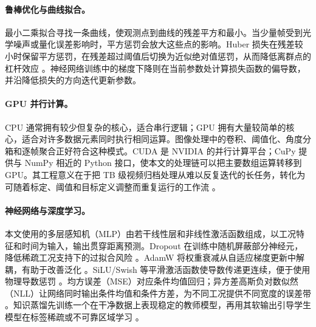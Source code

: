 \paragraph{鲁棒优化与曲线拟合。}
最小二乘拟合寻找一条曲线，使观测点到曲线的残差平方和最小。当少量帧受到光学噪声或量化误差影响时，平方惩罚会放大这些点的影响。Huber 损失在残差较小时保留平方惩罚，在残差超过阈值后切换为近似绝对值惩罚，从而降低离群点的杠杆效应 \cite{Huber1964,NocedalWright2006}。神经网络训练中的梯度下降则在当前参数处计算损失函数的偏导数，并沿降低损失的方向迭代更新参数。

\paragraph{GPU 并行计算。}
CPU 通常拥有较少但复杂的核心，适合串行逻辑；GPU 拥有大量较简单的核心，适合对许多数据元素同时执行相同运算。图像处理中的卷积、阈值化、角度分箱和逐帧聚合正好符合这种模式。CUDA 是 NVIDIA 的并行计算平台；CuPy 提供与 NumPy 相近的 Python 接口，使本文的处理链可以把主要数组运算转移到 GPU。其工程意义在于把 TB 级视频归档处理从难以反复迭代的长任务，转化为可随着标定、阈值和目标定义调整而重复运行的工作流 \cite{NickollsBuckGarlandSkadron2008}。

\paragraph{神经网络与深度学习。}
本文使用的多层感知机（MLP）由若干线性层和非线性激活函数组成，以工况特征和时间为输入，输出贯穿距离预测。Dropout 在训练中随机屏蔽部分神经元，降低稀疏工况支持下的过拟合风险 \cite{Srivastava2014Dropout}。AdamW 将权重衰减从自适应梯度更新中解耦，有助于改善泛化 \cite{LoshchilovHutter2019AdamW}。SiLU/Swish 等平滑激活函数使导数传递更连续，便于使用物理导数惩罚 \cite{Ramachandran2017Swish}。均方误差（MSE）对应条件均值回归；异方差高斯负对数似然（NLL）让网络同时输出条件均值和条件方差，为不同工况提供不同宽度的误差带 \cite{KendallGal2017}。知识蒸馏先训练一个在干净数据上表现稳定的教师模型，再用其软输出引导学生模型在标签稀疏或不可靠区域学习 \cite{HintonVinyalsDean2015}。
